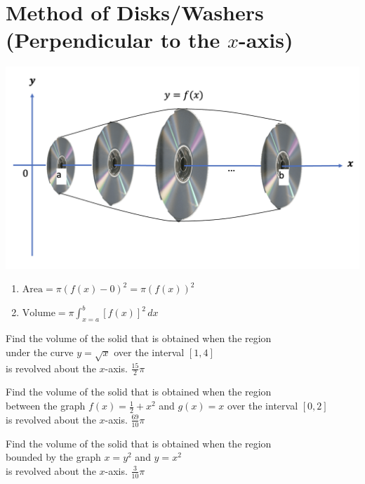 
\section{Method of Disks/Washers (Perpendicular to the $x$-axis)}

\begin{myframe}[arc=10pt,auto outer arc]
		\centering
		\includegraphics[width=0.7\linewidth]{chapter5/disc}
		
		\begin{enumerate}
			\item $\displaystyle \textrm{Area} = \pi\left(f(x) - 0\right)^2 = \pi\left(f(x) \right)^2$
			\item $\displaystyle \textrm{Volume} = \pi \int_{x=a}^b \left[ f(x) \right]^2 \, dx$
		\end{enumerate}
	
\end{myframe}

\problemans%
{Find the volume of the solid that is obtained when the region \\
	under the curve $y=\sqrt{x}$ over the interval $[1, 4]$  \\
	is revolved about the $x$-axis. 
}%
{$\displaystyle \frac{15}{2} \pi$}%

\newpage
\problemans%
{Find the volume of the solid that is obtained when the region \\
between the graph $\displaystyle f(x)=\frac{1}{2} + x^2$ and $g(x)=x$ over the interval $[0, 2]$ \\
is revolved about the $x$-axis.}%
{$\displaystyle \frac{69}{10}\pi$}%

\newpage
\problemans%
{Find the volume of the solid that is obtained when the region \\
	bounded by the graph $x=y^2$ and $y=x^2$ \\
	is revolved about the $x$-axis.
}%
{$\displaystyle \frac{3}{10} \pi$}%

